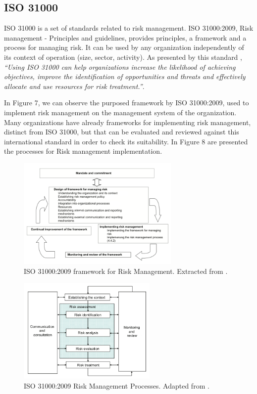 \subsection{ISO 31000}

ISO 31000 is a set of standards related to risk management. ISO 31000:2009, Risk management - Principles and guidelines, provides principles, a framework and a process for managing risk. It can be used by any organization independently of its context of operation (size, sector, activity). As presented by this standard \cite{ISO31000}, \textit{``Using ISO 31000 can help organizations increase the likelihood of achieving objectives, improve the identification of opportunities and threats and effectively allocate and use resources for risk treatment.''}.\par
In Figure 7, we can observe the purposed framework by ISO 31000:2009, used to implement risk management on the management system of the organization. Many organizations have already frameworks for implementing risk management, distinct from ISO 31000, but that can be evaluated and reviewed against this international standard in order to check its suitability. In Figure 8 are presented the processes for Risk management implementation.\par

\begin{figure}[h!]
\centering
\includegraphics[width=0.7\textwidth]{img/ISO31000Framework.png}
\caption{ISO 31000:2009 framework for Risk Management. Extracted from \cite{ISO31000}.}
\end{figure}

\begin{figure}[h!]
\centering
\includegraphics[width=0.6\textwidth]{img/ISO31000RiskProcesses.png}
\caption{ISO 31000:2009 Risk Management Processes. Adapted from \cite{ISO31000}.}
\end{figure}

